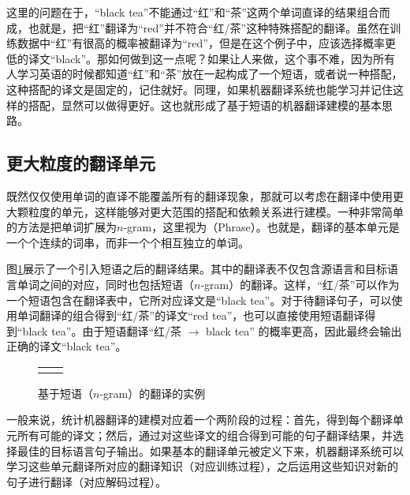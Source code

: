 \parinterval 这里的问题在于，“black tea”不能通过“红”和“茶”这两个单词直译的结果组合而成，也就是，把“红”翻译为“red”并不符合“红/茶”这种特殊搭配的翻译。虽然在训练数据中“红”有很高的概率被翻译为“red”，但是在这个例子中，应该选择概率更低的译文“black”。那如何做到这一点呢？如果让人来做，这个事不难，因为所有人学习英语的时候都知道“红”和“茶”放在一起构成了一个短语，或者说一种搭配，这种搭配的译文是固定的，记住就好。同理，如果机器翻译系统也能学习并记住这样的搭配，显然可以做得更好。这也就形成了基于短语的机器翻译建模的基本思路。


\subsection{更大粒度的翻译单元}

\parinterval 既然仅仅使用单词的直译不能覆盖所有的翻译现象，那就可以考虑在翻译中使用更大颗粒度的单元，这样能够对更大范围的搭配和依赖关系进行建模。一种非常简单的方法是把单词扩展为$n$-gram，这里视为{\small{}}（Phrase）。也就是，翻译的基本单元是一个个连续的词串，而非一个个相互独立的单词。

\parinterval 图\ref{fig:7-3}展示了一个引入短语之后的翻译结果。其中的翻译表不仅包含源语言和目标语言单词之间的对应，同时也包括短语（$n$-gram）的翻译。这样，“红/茶”可以作为一个短语包含在翻译表中，它所对应译文是“black tea”。对于待翻译句子，可以使用单词翻译的组合得到“红/茶”的译文“red tea”，也可以直接使用短语翻译得到“black tea”。由于短语翻译“红/茶 $\to$ black tea” 的概率更高，因此最终会输出正确的译文“black tea”。

\begin{figure}[htp]
\centering
\begin{tabular}{l r}
\subfigure{} & \subfigure{} \\
\end{tabular}
\caption{基于短语（$n$-gram）的翻译的实例}
\label{fig:7-3}
\end{figure}

\parinterval 一般来说，统计机器翻译的建模对应着一个两阶段的过程：首先，得到每个翻译单元所有可能的译文；然后，通过对这些译文的组合得到可能的句子翻译结果，并选择最佳的目标语言句子输出。如果基本的翻译单元被定义下来，机器翻译系统可以学习这些单元翻译所对应的翻译知识（对应训练过程），之后运用这些知识对新的句子进行翻译（对应解码过程）。

